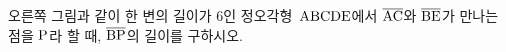 \noindent\begin{minipage}[t]{0.58\linewidth}\vspace{0pt}\raggedright 오른쪽 그림과 같이 한 변의 길이가 $6$인 정오각형~$\mathrm{ABCDE}$에서 $\overline{\mathrm{AC}}$와 $\overline{\mathrm{BE}}$가 만나는 점을 $\mathrm{P}$라 할 때, $\overline{\mathrm{BP}}$의 길이를 구하시오.\end{minipage}\hfill\begin{minipage}[t]{0.4\linewidth}\vspace{0pt}\centering \resizebox{\ifdim\width>\linewidth\linewidth\else\width\fi}{!}{}\end{minipage}\par
